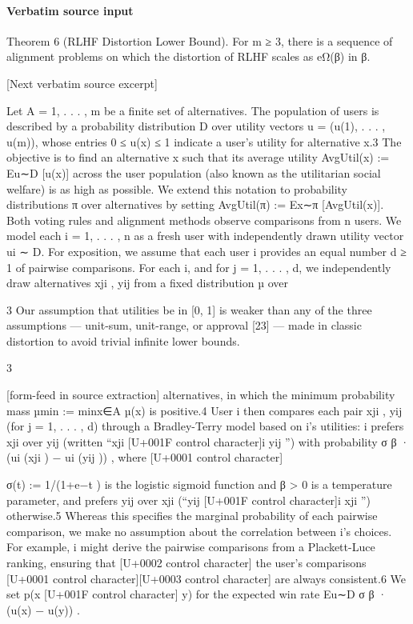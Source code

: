 \documentclass[10pt]{article}
\begin{document}
\paragraph{Verbatim source input}
\begin{ReviewVerbatim}
Theorem 6 (RLHF Distortion Lower Bound). For m ≥ 3, there is a sequence of alignment problems
on which the distortion of RLHF scales as eΩ(β) in β.


[Next verbatim source excerpt]

Let A = {1, . . . , m} be a finite set of alternatives. The population of users is described by a
probability distribution D over utility vectors u = (u(1), . . . , u(m)), whose entries 0 ≤ u(x) ≤ 1
indicate a user’s utility for alternative x.3 The objective is to find an alternative x such that its average
utility AvgUtil(x) := Eu∼D [u(x)] across the user population (also known as the utilitarian social
welfare) is as high as possible. We extend this notation to probability distributions π over alternatives
by setting AvgUtil(π) := Ex∼π [AvgUtil(x)].
Both voting rules and alignment methods observe comparisons from n users. We model each
i = 1, . . . , n as a fresh user with independently drawn utility vector ui ∼ D. For exposition, we
assume that each user i provides an equal number d ≥ 1 of pairwise comparisons. For each i,
and for j = 1, . . . , d, we independently draw alternatives xji , yij from a fixed distribution µ over

    3
     Our assumption that utilities be in [0, 1] is weaker than any of the three assumptions — unit-sum, unit-range,
or approval [23] — made in classic distortion to avoid trivial infinite lower bounds.


                                                           3

[form-feed in source extraction]
alternatives, in which the minimum probability mass µmin := minx∈A µ(x) is positive.4 User i
then compares each pair {xji , yij } (for j = 1, . . . , d) through a Bradley-Terry model based on i’s
utilities: i prefers xji over yij (written “xji [U+001F control character]i yij ”) with probability σ β · (ui (xji ) − ui (yij )) , where
                                                                                                        [U+0001 control character]

σ(t) := 1/(1+e−t ) is the logistic sigmoid function and β > 0 is a temperature parameter, and prefers
yij over xji (“yij [U+001F control character]i xji ”) otherwise.5 Whereas this specifies the marginal probability of each pairwise
comparison, we make no assumption about the correlation between i’s choices. For example, i might
derive the pairwise comparisons from a Plackett-Luce ranking, ensuring that      [U+0002 control character] the user’s comparisons  [U+0001 control character][U+0003 control character]
are always consistent.6 We set p(x [U+001F control character] y) for the expected win rate Eu∼D σ β · (u(x) − u(y)) .


\end{ReviewVerbatim}
\end{document}
